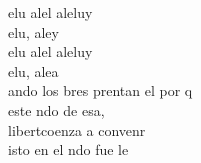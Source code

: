 \begin{cancion}%
	elu  alel aleluy \\
	elu, aley \\
	elu  alel aleluy \\
	elu, alea \\
	\jump
	ando los bres prentan el por q\\
	 este ndo de esa,\\
	 libertcoenza a convenr\\
	isto en el ndo fue le \\
\end{cancion}%
